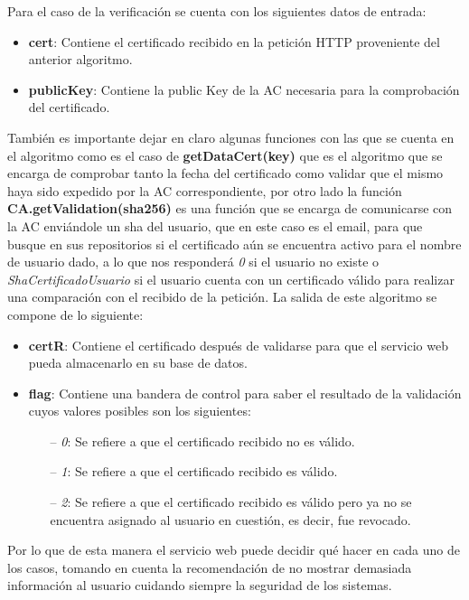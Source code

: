 \documentclass[12pt, a4paper, titlepage]{report}
\begin{document}
                Para el caso de la verificaci\'on se cuenta con los siguientes datos de entrada:
                \begin{itemize}
                    \item \textbf{cert}: Contiene el certificado recibido en la petici\'on HTTP proveniente del anterior algoritmo.
                    \item \textbf{publicKey}: Contiene la public Key de la AC necesaria para la comprobaci\'on del certificado.
                \end{itemize}
                Tambi\'en es importante dejar en claro algunas funciones con las que se cuenta en el algoritmo como es el caso de \textbf{getDataCert(key)} que es el algoritmo que se encarga de comprobar tanto la fecha del certificado como validar que el mismo haya sido expedido por la AC correspondiente, por otro lado la funci\'on \textbf{CA.getValidation(sha256)} es una función que se encarga de comunicarse con la AC enviándole un sha del usuario, que en este caso es el email, para que busque en sus repositorios si el certificado aún se encuentra activo para el nombre de usuario dado, a lo que nos responderá \textit{0} si el usuario no existe o \textit{ShaCertificadoUsuario} si el usuario cuenta con un certificado válido para realizar una comparación con el recibido de la petición. 
                La salida de este algoritmo se compone de lo siguiente:
                \begin{itemize}
                    \item \textbf{certR}: Contiene el certificado después de validarse para que el servicio web pueda almacenarlo en su base de datos.
                    \item \textbf{flag}: Contiene una bandera de control para saber el resultado de la validación cuyos valores posibles son los siguientes:
                    \begin{itemize}
                        \item[--] \textit{0}: Se refiere a que el certificado recibido no es válido.
                        \item[--] \textit{1}: Se refiere a que el certificado recibido es válido.
                        \item[--] \textit{2}: Se refiere a que el certificado recibido es válido pero ya no se encuentra asignado al usuario en cuesti\'on, es decir, fue revocado.
                    \end{itemize}
                \end{itemize}
                Por lo que de esta manera el servicio web puede decidir qué hacer en cada uno de los casos, tomando en cuenta la recomendación de no mostrar demasiada información al usuario cuidando siempre la seguridad de los sistemas.
\end{document}
